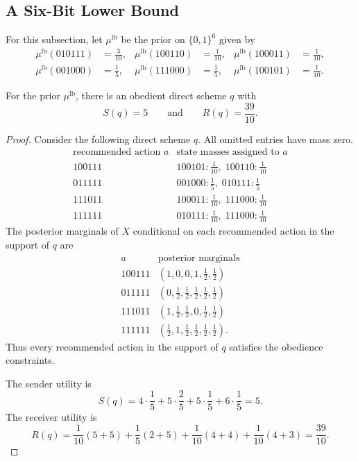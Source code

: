 \documentclass[format=acmsmall, review=false]{acmart}
\begin{document}
\subsection{A Six-Bit Lower Bound}

For this subsection, let $\mu^{\mathrm{lb}}$ be the prior on $\{0,1\}^6$ given
by
\[
\begin{aligned}
\mu^{\mathrm{lb}}(010111)&=\frac{3}{10},&
\mu^{\mathrm{lb}}(100110)&=\frac{1}{10},&
\mu^{\mathrm{lb}}(100011)&=\frac{1}{10},\\
\mu^{\mathrm{lb}}(001000)&=\frac{1}{5},&
\mu^{\mathrm{lb}}(111000)&=\frac{1}{5},&
\mu^{\mathrm{lb}}(100101)&=\frac{1}{10}.
\end{aligned}
\]

\begin{lemma}
\label{lem:six-bit-primal}
For the prior $\mu^{\mathrm{lb}}$, there is an obedient direct scheme $q$ with
\[
S(q)=5
\qquad\text{and}\qquad
R(q)=\frac{39}{10}.
\]
\end{lemma}

\begin{proof}
Consider the following direct scheme $q$. All omitted entries have mass zero.
\[
\begin{array}{c|c}
\text{recommended action }a & \text{state masses assigned to }a\\
\hline
100111 & 100101:\frac{1}{10},\;100110:\frac{1}{10}\\
011111 & 001000:\frac{1}{5},\;010111:\frac{1}{5}\\
111011 & 100011:\frac{1}{10},\;111000:\frac{1}{10}\\
111111 & 010111:\frac{1}{10},\;111000:\frac{1}{10}
\end{array}
\]
The posterior marginals of $X$ conditional on each recommended action in the
support of $q$ are
\[
\begin{array}{c|c}
a & \text{posterior marginals}\\
\hline
100111 & (1,0,0,1,\frac12,\frac12)\\
011111 & (0,\frac12,\frac12,\frac12,\frac12,\frac12)\\
111011 & (1,\frac12,\frac12,0,\frac12,\frac12)\\
111111 & (\frac12,1,\frac12,\frac12,\frac12,\frac12).
\end{array}
\]
Thus every recommended action in the support of $q$ satisfies the obedience
constraints.

The sender utility is
\[
S(q)=
4\cdot\frac15
+5\cdot\frac25
+5\cdot\frac15
+6\cdot\frac15
=5.
\]
The receiver utility is
\[
R(q)
=\frac{1}{10}(5+5)
+\frac15(2+5)
+\frac{1}{10}(4+4)
+\frac{1}{10}(4+3)
=\frac{39}{10}.
\]
\end{proof}
\end{document}
